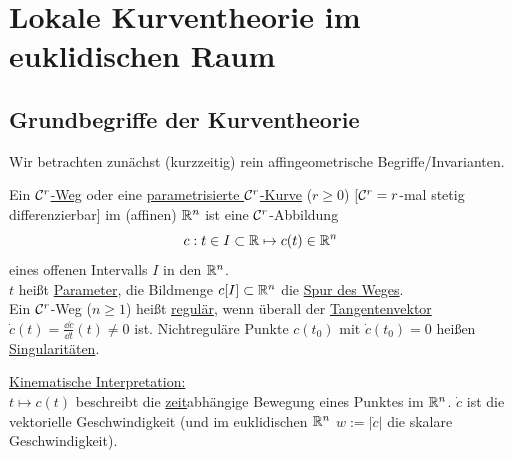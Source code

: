 \chapter{Lokale Kurventheorie im euklidischen Raum}
\section{Grundbegriffe der Kurventheorie}
Wir betrachten zunächst (kurzzeitig) rein affingeometrische Begriffe/Invarianten.
\begin{definition}
 Ein \uline{\(\mathcal{C}^r\)-Weg} oder eine \uline{parametrisierte \(\mathcal{C}^r\)-Kurve} (\(r\ge 0\)) [\(\mathcal{C}^r = r\)-mal stetig differenzierbar] im (affinen) \(\mathbb{R}^n\) ist eine \(\mathcal{C}^r\)-Abbildung 
\[
 c: t\in I \subset \mathbb{R} \mapsto c(t)\in \mathbb{R}^n
\]
eines offenen Intervalls \(I\) in den \(\mathbb{R}^n\). \\
\(t\) heißt \uline{Parameter}, die Bildmenge \(c[I] \subset \mathbb{R}^n\) die \uline{Spur des Weges}. \\
Ein \(\mathcal{C}^r\)-Weg (\(n\ge 1\)) heißt \uline{regulär}, wenn überall der \uline{Tangentenvektor} \(\dot c(t) = \frac{\dd c}{\dd t}(t) \ne 0\) ist. Nichtreguläre Punkte \(c(t_0)\) mit \(\dot c(t_0)=0\) heißen \uline{Singularitäten}.
\end{definition}
\uline{Kinematische Interpretation:} \\
\(t \mapsto c(t)\) beschreibt die \uline{zeit}abhängige Bewegung eines Punktes im \(\mathbb{R}^n\).
\(\dot c\) ist die vektorielle Geschwindigkeit (und im euklidischen \(\mathbb{R}^n\) \(w:= | \dot c|\) die skalare Geschwindigkeit).


